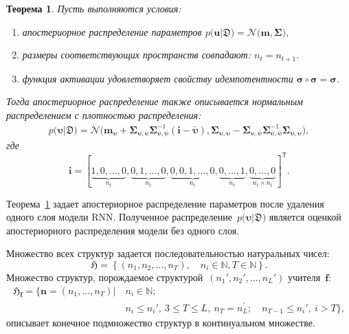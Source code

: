 \documentclass{dissert}
\newtheorem{theorem}{Теорема}
\begin{document}
\begin{theorem}
\label{ch-3:th:rnn:later}
Пусть выполняются условия:
\begin{enumerate}
\item[1)] апостериорное распределение параметров $p\bigr(\mathbf{u}|\mathfrak{D}\bigr) = \mathcal{N}\bigr(\mathbf{m}, \bm{\Sigma}\bigr),$
\item[2)] размеры соответствующих пространств совпадают: $n_t=n_{t+1}.$
\item[3)] функция активации удовлетворяет свойству идемпотентности $\bm{\sigma} \circ \bm{\sigma} = \bm{\sigma}$.
\end{enumerate}
Тогда апостериорное распределение также описывается нормальным распределением с плотностью распределения:
\[
\begin{aligned}
p\bigr(\bm{\upsilon}|\mathfrak{D}\bigr) = \mathcal{N}\bigr(\mathbf{m}_{\bm{\upsilon}}+\bm{\Sigma}_{\bm{\upsilon},\bar{\bm{\upsilon}}} \bm{\Sigma}_{\bar{\bm{\upsilon}},\bar{\bm{\upsilon}}}^{-1} \left(\mathbf{i} - \bar{\bm{\upsilon}}\right), \bm{\Sigma}_{\bm{\upsilon},\bm{\upsilon}} - \bm{\Sigma}_{\bm{\upsilon},\bar{\bm{\upsilon}}}\bm{\Sigma}_{\bar{\bm{\upsilon}},\bar{\bm{\upsilon}}}^{-1}\bm{\Sigma}_{\bm{\upsilon},\bar{\bm{\upsilon}}}\bigr),
\end{aligned}
\]
где
\[
\mathbf{i}=[\underbrace{1, 0, \ldots, 0}_{n_t}, \underbrace{0, 1, \ldots, 0}_{n_t}, \underbrace{0, 0, 1, \ldots, 0}_{n_t}, \underbrace{0, \ldots, 1}_{n_t}, \underbrace{0, \ldots, 0}_{n_t\times n_t}]^{\mathsf{T}}.
\]
\end{theorem}

Теорема~\ref{ch-3:th:rnn:later} задает апостериорное распределение параметров после удаления одного слоя модели RNN. Полученное распределение~$p\bigr(\bm{\upsilon}|\mathfrak{D}\bigr)$ является оценкой апостериорного распределения модели без одного слоя.

Множество всех структур задается последовательностью натуральных чисел:
\[
\mathfrak{H} = \left\{(n_1, n_2, \ldots, n_{T}), \quad n_i \in \mathbb{N}, T \in \mathbb{N}\right\}.
\]
Множество структур, порождаемое структурой~$(n_{1}', n_{2}', \ldots, n_{L}')$ учителя~$\mathbf{f}$:
\[
\begin{aligned}
    \mathfrak{H}_{\mathbf{f}} = \Big\{\mathbf{n} = \left(n_1, \ldots, n_{T}\right)|~&n_i \in \mathbb{N}; \\
    & n_i \leq n_{i}',~3\leq T\leq L,~n_{T}=n^{'}_{L}; \quad n_{T-1} \leq n_{i}',~i > T\Big\},
\end{aligned}
\]
описывает конечное подмножество структур в континуальном множестве.
\end{document}
